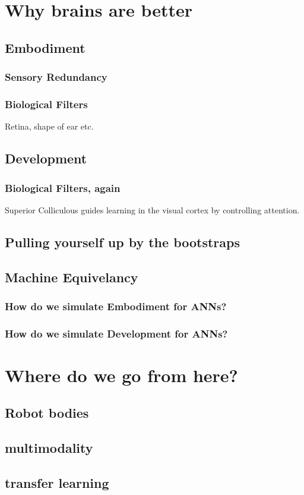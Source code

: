 \section{Why brains are better}
\subsection{Embodiment}
\subsubsection{Sensory Redundancy}
\subsubsection{Biological Filters}
Retina, shape of ear etc.
\subsection{Development}
\subsubsection{Biological Filters, again}
Superior Colliculous guides learning in the visual cortex by controlling attention.
\subsection{Pulling yourself up by the bootstraps}

\subsection{Machine Equivelancy}
\subsubsection{How do we simulate Embodiment for ANNs?}
\subsubsection{How do we simulate Development for ANNs?}

\section{Where do we go from here?}
\subsection{Robot bodies}
\subsection{multimodality}
\subsection{transfer learning}


